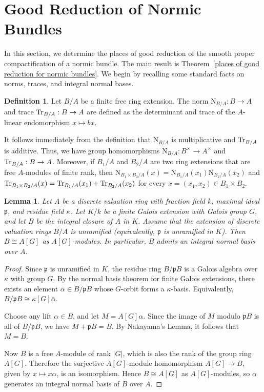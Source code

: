 \documentclass[10pt]{amsart}
\theoremstyle{plain}
\newtheorem{lemma}[thm]{Lemma}
\theoremstyle{definition}
\newtheorem{definition}[thm]{Definition}
\newcommand{\Tr}{{\rm Tr}}
\newcommand{\p}{{\mathfrak p}}
\newcommand{\Nm}{\mathrm{N}}
\begin{document}

\section{Good Reduction of Normic Bundles}
In this section, we determine the places of good reduction of the smooth proper compactification of a normic bundle. The main result is Theorem~\ref{places of good reduction for normic bundles}. We begin by recalling some standard facts on norms, traces, and integral normal bases.
\begin{definition}
Let \(B/A\) be a finite free ring extension. The norm \(\Nm_{B/A}:B\to A\) and trace \(\Tr_{B/A}:B\to A\) are defined as the determinant and trace of the \(A\)-linear endomorphism \(x\mapsto bx\).
\end{definition}

It follows immediately from the definition that \(\Nm_{B/A}\) is multiplicative and
\(\Tr_{B/A}\) is additive. Thus, we have group homomorphisms
\(\Nm_{B/A}: B^\times \to A^\times\) and
\(\Tr_{B/A}: B \to A\). Moreover, if \(B_1/A\) and \(B_2/A\) are two ring extensions that are free
\(A\)-modules of finite rank, then
\(\Nm_{B_1\times B_2/A}(x)
= \Nm_{B_1/A}(x_1)\Nm_{B_2/A}(x_2)\)
and
\(\Tr_{B_1\times B_2/A}(x)
= \Tr_{B_1/A}(x_1)+\Tr_{B_2/A}(x_2)\)
for every \(x=(x_1,x_2)\in B_1\times B_2\).

\begin{lemma}\label{normal integral basis}
Let $A$ be a discrete valuation ring with fraction field $k$, maximal ideal
$\mathfrak p$, and residue field $\kappa$. Let $K/k$ be a finite Galois
extension with Galois group $G$, and let $B$ be the integral closure of $A$ in
$K$. Assume that the extension of discrete valuation rings $B/A$ is
unramified (equivalently, $\mathfrak p$ is unramified in $K$). Then
$B\cong A[G]$ as $A[G]$-modules. In particular, $B$ admits an integral normal
basis over $A$.
\end{lemma}

\begin{proof}
Since $\p$ is unramified in $K$, the residue ring $B/\mathfrak{p}B$ is a Galois algebra over $\kappa$ with group $G$. By the normal basis theorem for finite Galois extensions, there exists an element $\bar{\alpha}\in B/\mathfrak{p}B$ whose $G$-orbit forms a $\kappa$-basis. Equivalently, $B/\mathfrak{p}B \cong \kappa[G]\bar{\alpha}$.

Choose any lift $\alpha\in B$, and let $M=A[G]\alpha$. Since the image of $M$ modulo $\mathfrak{p}B$ is all of $B/\mathfrak{p}B$, we have $M+\mathfrak{p}B=B$. By Nakayama's Lemma, it follows that $M=B$.

Now $B$ is a free $A$-module of rank $|G|$, which is also the rank of the group ring $A[G]$. Therefore the surjective $A[G]$-module homomorphism $A[G]\to B$, given by $x\mapsto x\alpha$, is an isomorphism. Hence $B\cong A[G]$ as $A[G]$-modules, so $\alpha$ generates an integral normal basis of $B$ over $A$.
\end{proof}
\end{document}
